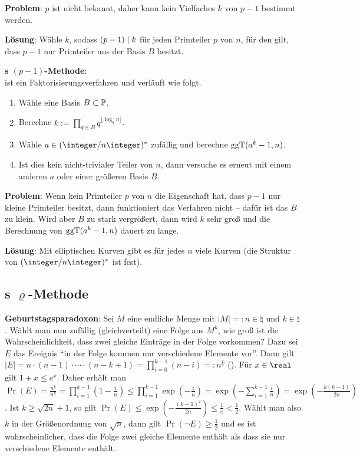 \textbf{Problem}:
$p$ ist nicht bekannt, daher kann kein Vielfaches $k$ von $p - 1$ bestimmt werden.

\textbf{Lösung}:
Wähle $k$, sodass $(p - 1) \mid k$ für jeden Primteiler $p$ von $n$,
für den gilt, dass $p - 1$ nur Primteiler aus der Basis $B$ besitzt.

\linie

\textbf{s $(p-1)$-Methode}:\\
 ist ein Faktorisierungsverfahren und verläuft wie folgt.
\begin{enumerate}
    \item
    Wähle eine Basis $B \subset \mathbb{P}$.

    \item
    Berechne $k := \prod_{q \in B} q^{\lfloor \log_q n \rfloor}$.

    \item
    Wähle $a \in (\ZnZ)^\ast$ zufällig und berechne $\operatorname{ggT}(a^k - 1, n)$.

    \item
    Ist dies kein nicht-trivialer Teiler von $n$, dann versuche es erneut mit einem anderen
    $a$ oder einer größeren Basis $B$.
\end{enumerate}

\linie

\textbf{Problem}:
Wenn kein Primteiler $p$ von $n$ die Eigenschaft hat, dass $p - 1$ nur kleine Primteiler besitzt,
dann funktioniert das Verfahren nicht -- dafür ist das $B$ zu klein.
Wird aber $B$ zu stark vergrößert, dann wird $k$ sehr groß und die Berechnung von
$\operatorname{ggT}(a^k - 1, n)$ dauert zu lange.

\textbf{Lösung}:
Mit elliptischen Kurven gibt es für jedes $n$ viele Kurven
(die Struktur von $(\ZnZ)^\ast$ ist fest).

\pagebreak

\subsection{%
    s \texorpdfstring{$\varrho$}{ρ}-Methode%
}

\textbf{Geburtstagsparadoxon}:
Sei $M$ eine endliche Menge mit $|M| =: n \in \natural$ und $k \in \natural$.
Wählt man nun zufällig (gleichverteilt) eine Folge aus $M^k$,
wie groß ist die Wahrscheinlichkeit, dass zwei
gleiche Einträge in der Folge vorkommen?
Dazu sei $E$ das Ereignis "`in der Folge kommen nur verschiedene Elemente vor"'.
Dann gilt
$|E| = n \cdot (n - 1) \cdot \dotsb \cdot (n - k + 1) = \prod_{i=0}^{k-1} (n-i) =:
n^{\underline{k}}$
().
Für $x \in \real$ gilt $1 + x \le e^x$.
Daher erhält man\\
$\Pr(E) = \frac{n^{\underline{k}}}{n^k} = \prod_{i=1}^{k-1} (1 - \frac{i}{n})
\le \prod_{i=1}^{k-1} \exp(-\frac{i}{n}) = \exp(-\sum_{i=1}^{k-1} \frac{i}{n})
= \exp(-\frac{k(k-1)}{2n})$.
Ist $k \ge \sqrt{2n} + 1$, so gilt
$\Pr(E) \le \exp(-\frac{(k-1)^2}{2n}) \le \frac{1}{e} < \frac{1}{2}$.
Wählt man also $k$ in der Größenordnung von $\sqrt{n}$, dann gilt
$\Pr(\lnot E) \ge \frac{1}{2}$ und es ist wahrscheinlicher, dass die Folge zwei gleiche
Elemente enthält als dass sie nur verschiedene Elemente enthält.

